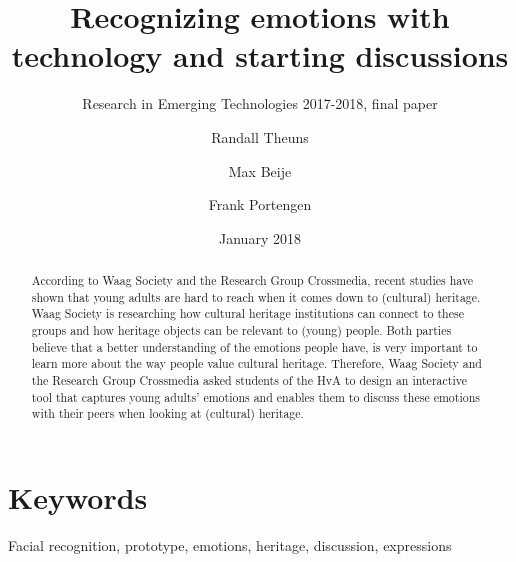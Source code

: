 \documentclass[sigconf]{acmart}
\begin{document}
\title{Recognizing emotions with technology and starting discussions}
\subtitle{Research in Emerging Technologies 2017-2018, final paper}
\date{January 2018}

\author{Randall Theuns}

\author{Max Beije}

\author{Frank Portengen}

\begin{abstract}
\noindent
According to Waag Society and the Research Group Crossmedia, recent studies have shown that
young adults are hard to reach when it comes down to (cultural) heritage.
Waag Society is researching how cultural heritage institutions can connect to these groups and
how heritage objects can be relevant to (young) people.
Both parties believe that a better understanding of the emotions people have,
is very important to learn more about the way people value cultural heritage.
Therefore, Waag Society and the Research Group Crossmedia asked students of the HvA to
design an interactive tool that captures young adults’ emotions and enables them to discuss
these emotions with their peers when looking at (cultural) heritage.
\end{abstract}

\maketitle


\section{Keywords}
Facial recognition, prototype, emotions, heritage, discussion, expressions
\end{document}
